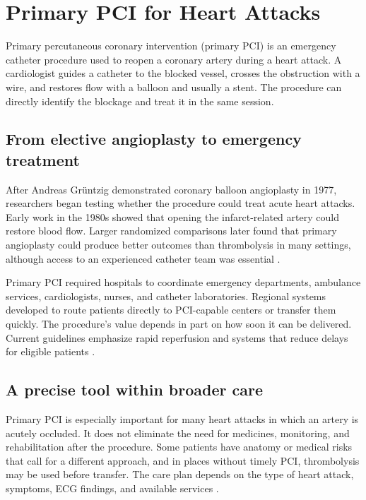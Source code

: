 \documentclass[12pt,oneside]{book}
\begin{document}
\chapter[Primary PCI for Heart Attacks]{Primary PCI for Heart Attacks}

Primary percutaneous coronary intervention (primary PCI) is an emergency
catheter procedure used to reopen a coronary artery during a heart attack.
A cardiologist guides a catheter to the blocked vessel, crosses the
obstruction with a wire, and restores flow with a balloon and usually a
stent. The procedure can directly identify the blockage and treat it in
the same session.

\section{From elective angioplasty to emergency treatment}
After Andreas Grüntzig demonstrated coronary balloon angioplasty in 1977,
researchers began testing whether the procedure could treat acute heart
attacks. Early work in the 1980s showed that opening the infarct-related
artery could restore blood flow. Larger randomized comparisons later found
that primary angioplasty could produce better outcomes than thrombolysis
in many settings, although access to an experienced catheter team was
essential \cite{stemiTreatmentHistory,primaryPCITrial}.

Primary PCI required hospitals to coordinate emergency departments,
ambulance services, cardiologists, nurses, and catheter laboratories.
Regional systems developed to route patients directly to PCI-capable
centers or transfer them quickly. The procedure's value depends in part on
how soon it can be delivered. Current guidelines emphasize rapid
reperfusion and systems that reduce delays for eligible patients
\cite{ahaAcuteCoronaryGuideline}.

\section{A precise tool within broader care}
Primary PCI is especially important for many heart attacks in which an
artery is acutely occluded. It does not eliminate the need for medicines,
monitoring, and rehabilitation after the procedure. Some patients have
anatomy or medical risks that call for a different approach, and in places
without timely PCI, thrombolysis may be used before transfer. The care
plan depends on the type of heart attack, symptoms, ECG findings, and
available services \cite{ahaAcuteCoronaryGuideline}.
\end{document}
